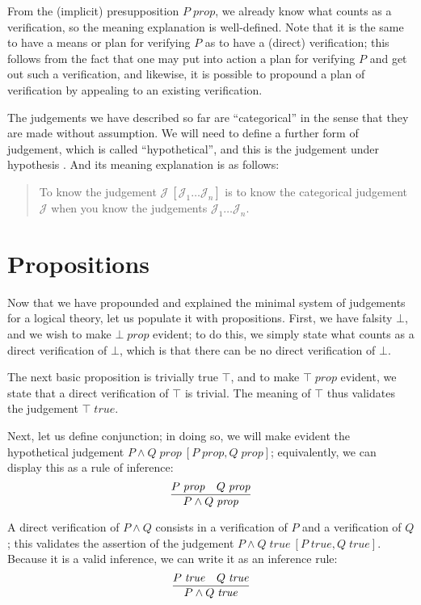 \documentclass{amsart}
\theoremstyle{definition}
\theoremstyle{remark}
\numberwithin{equation}{section}
\newcommand\isprop[1]{\ensuremath{#1\;\mathit{prop}}}
\newcommand\istrue[1]{\ensuremath{#1\;\mathit{true}}}
\newcommand\hyp[2]{\ensuremath{#1\ [#2]}}
\begin{document}
From the (implicit) presupposition \isprop{P}, we already know what counts as a
verification, so the meaning explanation is well-defined. Note that it is the
same to have a means or plan for verifying $P$ as to have a (direct)
verification; this follows from the fact that one may put into action a plan
for verifying $P$ and get out such a verification, and likewise, it is possible
to propound a plan of verification by appealing to an existing verification.

The judgements we have described so far are ``categorical'' in the sense that
they are made without assumption. We will need to define a further form of
judgement, which is called ``hypothetical'', and this is the judgement under
hypothesis \framebox{\hyp{\mathcal{J}}{\mathcal{J}_1\dots\mathcal{J}_n}}. And
its meaning explanation is as follows:

\begin{quote}
  To know the judgement \hyp{\mathcal{J}}{\mathcal{J}_1\dots\mathcal{J}_n} is to know the
  categorical judgement $\mathcal{J}$ when you know the judgements
  $\mathcal{J}_1\dots\mathcal{J}_n$.
\end{quote}


\section{Propositions}
Now that we have propounded and explained the minimal system of judgements for
a logical theory, let us populate it with propositions. First, we have falsity
$\bot$, and we wish to make \isprop{\bot} evident; to do this, we simply state
what counts as a direct verification of $\bot$, which is that there can be no
direct verification of $\bot$.

The next basic proposition is trivially true $\top$, and to make \isprop{\top}
evident, we state that a direct verification of $\top$ is trivial. The meaning
of $\top$ thus validates the judgement \istrue{\top}.

Next, let us define conjunction; in doing so, we will make evident the
hypothetical judgement \hyp{\isprop{P\land Q}}{\isprop{P},\isprop{Q}};
equivalently, we can display this as a rule of inference:
\[
  \infer{
    \isprop{P\land Q}
  }{
    \isprop{P} &
    \isprop{Q}
  }
\]

A direct verification of $P\land Q$ consists in a verification of $P$
and a verification of $Q$; this validates the assertion of the judgement
\hyp{\istrue{P\land Q}}{\istrue{P},\istrue{Q}}. Because it is a valid
inference, we can write it as an inference rule:
\[
  \infer{
    \istrue{P\land Q}
  }{
    \istrue{P} &
    \istrue{Q}
  }
\]
\end{document}
